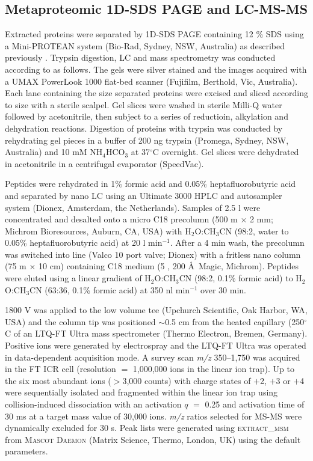 \subsection{Metaproteomic \acs{1D-SDS PAGE} and \acs{LC}-\acs{MS-MS}}
Extracted proteins were separated by \ac{1D-SDS PAGE} containing 12 \% SDS using a Mini-PROTEAN system (Bio-Rad, Sydney, NSW, Australia) as described previously \cite{Saunders2006}.
Trypsin digestion, \ac{LC} and mass spectrometry was conducted according to \citet{Ng2010a} as follows.
The gels were silver stained and the images acquired with a UMAX PowerLook 1000 flat-bed scanner (Fujifilm, Berthold, Vic, Australia).
Each lane containing the size separated proteins were excised and sliced according to size with a sterile scalpel.
Gel slices were washed in sterile Milli-Q water followed by acetonitrile, then subject to a series of reductioin, alkylation and dehydration reactions.
Digestion of proteins with trypsin was conducted by rehydrating gel pieces in a buffer of 200 ng trypsin (Promega, Sydney, NSW, Australia) and 10 mM NH$_4$HCO$_3$ at 37$^{\circ}$C overnight. 
Gel slices were dehydrated in acetonitrile in a centrifugal evaporator (SpeedVac).

Peptides were rehydrated in 1\% formic acid and 0.05\% heptafluorobutyric acid and separated by nano \ac{LC} using an Ultimate 3000 \acs{HPLC} and autosampler system (Dionex, Amsterdam, the Netherlands).
Samples of 2.5 \textmu{}l were concentrated and desalted onto a micro C18 precolumn (500 \textmu{}m $\times$ 2 mm; Michrom Bioresources, Auburn, \textsc{CA}, \textsc{USA}) with H$_2$O:CH$_3$CN (98:2, water to 0.05\% heptafluorobutyric acid) at 20 \textmu{}l min$^{-1}$.
After a 4 min wash, the precolumn was switched into line (Valco 10 port valve; Dionex) with a fritless nano column (75 \textmu{}m $\times$ 10 cm) containing C18 medium (5 \textmu{}, 200 \AA\ Magic, Michrom).
Peptides were eluted using a linear gradient of H$_2$O:CH$_3$CN (98:2, 0.1\% formic acid) to H$_2$O:CH$_3$CN (63:36, 0.1\% formic acid) at 350 nl min$^{-1}$ over 30 min.

1800 V was applied to the low volume tee (Upchurch Scientific, Oak Harbor, \textsc{WA}, \textsc{USA}) and the column tip was positioned $\sim$0.5 cm from the heated capillary (250$^{\circ}$C of an LTQ-FT Ultra mass spectrometer (Thermo Electron, Bremen, Germany).
Positive ions were generated by electrospray and the LTQ-FT Ultra was operated in data-dependent acquisition mode.
A survey scan \emph{m/z} 350--1,750 was acquired in the FT ICR cell (resolution $=$ 1,000,000 ions in the linear ion trap).
Up to the six most abundant ions ($>$3,000 counts) with charge states of $+$2, $+$3 or $+$4 were sequentially isolated and fragmented within the linear ion trap using collision-induced dissociation with an activation $q$ $=$ 0.25 and activation time of 30 ms at a target mass value of 30,000 ions.
\emph{m/z} ratios selected for \ac{MS-MS} were dynamically excluded for 30 s.
Peak lists were generated using \textsc{extract\_msm} from \textsc{Mascot Daemon} (Matrix Science, Thermo, London, \textsc{UK}) using the default parameters.

